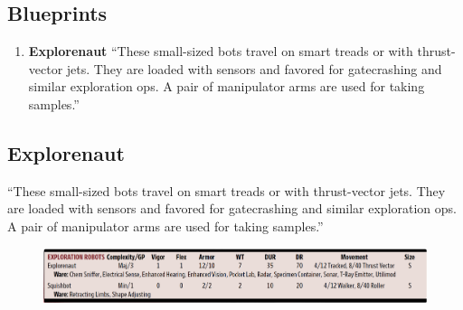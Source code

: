 \subsection{Blueprints}

\begin{enumerate}

    \item \textbf{\gls{Explorenaut}} “These small-sized bots travel on smart treads or with thrust-vector jets. They are loaded with sensors and favored for gatecrashing and similar exploration ops. A pair of manipulator arms are used for taking samples.” \citep[pg. 347]{ep2e_1.1_2019}

\end{enumerate}


\subsection{Explorenaut}

“These small-sized bots travel on smart treads or with thrust-vector jets. They are loaded with sensors and favored for gatecrashing and similar exploration ops. A pair of manipulator arms are used for taking samples.” \citep[pg. 347]{ep2e_1.1_2019}

\begin{figure}[h]
    \includegraphics[width=\textwidth]{img/explorationRobots.png}
\end{figure}

